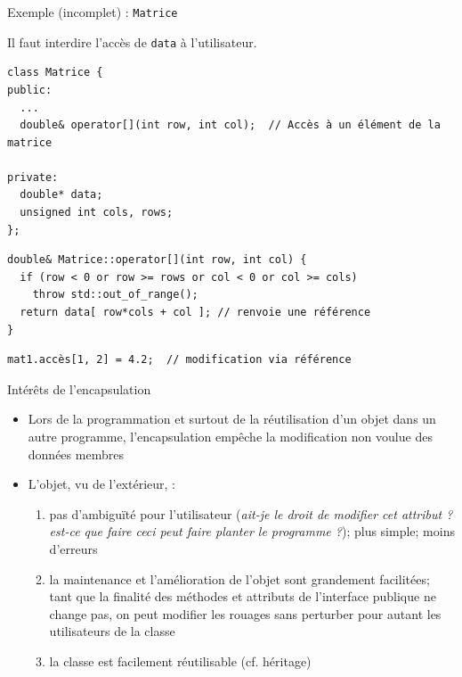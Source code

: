 \documentclass[c]{beamer}
\begin{document}

\begin{frame}[fragile]{Exemple (incomplet) : \texttt{Matrice}}

Il faut interdire l'accès de \texttt{data} à l'utilisateur.
\vspace{1em}
\begin{verbatim}
class Matrice {
public:
  ...
  double& operator[](int row, int col);  // Accès à un élément de la matrice

private:
  double* data;
  unsigned int cols, rows;
};
\end{verbatim}
\pause
\vspace{1em}
\begin{verbatim}
double& Matrice::operator[](int row, int col) {
  if (row < 0 or row >= rows or col < 0 or col >= cols)
    throw std::out_of_range();
  return data[ row*cols + col ]; // renvoie une référence
}
\end{verbatim}
\pause
\vspace{1em}
\begin{verbatim}
mat1.accès[1, 2] = 4.2;  // modification via référence
\end{verbatim}

\end{frame}


\begin{frame}[fragile]{Intérêts de l'encapsulation}
\begin{itemize}
\item Lors de la programmation et surtout de la réutilisation d'un objet dans un
autre programme, l'encapsulation empêche la modification non voulue des données
membres

\item L'objet, vu de l'extérieur, \pause :

\begin{enumerate}[<+->]
\item pas d'ambiguïté pour l'utilisateur (\textit{ait-je le droit de modifier cet attribut ?} \textit{est-ce que faire ceci peut faire planter le programme ?}); plus simple; moins d'erreurs
\item la maintenance et l'amélioration de l'objet sont grandement facilitées; tant que la finalité des méthodes et attributs de l'interface publique ne change pas, on peut modifier les rouages sans perturber pour autant les utilisateurs de la classe
\item la classe est facilement réutilisable (cf. héritage)
\end{enumerate}
\end{itemize}
\end{frame}
\end{document}
